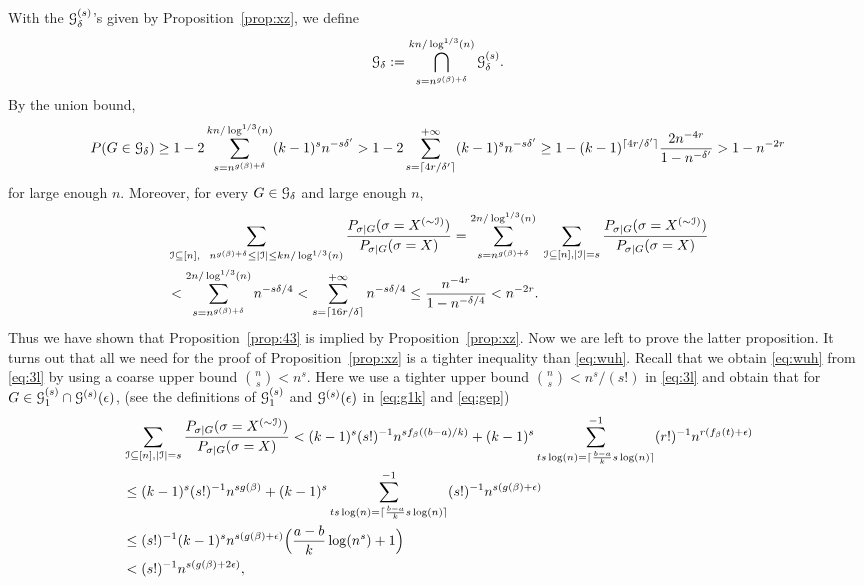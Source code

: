 \documentclass{article}
\begin{document}
With the $\mathcal{G}_\delta^{(s)}$'s given by Proposition~\ref{prop:xz}, we
define 
$$
\mathcal{G}_\delta:=\bigcap_{s=n^{g(\beta)+\delta}}^{kn/\log^{1/3}(n)} \mathcal{G}_\delta^{(s)} .
$$
By the union bound,
$$
P(G\in\mathcal{G}_\delta)\ge 1-2 \sum_{s=n^{g(\beta)+\delta}}^{kn/\log^{1/3}(n)} (k-1)^sn^{-s\delta'}
> 1-2 \sum_{s=\lceil 4r/\delta' \rceil}^{+\infty} (k-1)^sn^{-s\delta'}
\ge 1- (k-1)^{\lceil 4r/\delta' \rceil}\frac{2 n^{-4r}}{1-n^{-\delta'}}
>1-n^{-2r}
$$
for large enough $n$.
 Moreover, for every $G\in\mathcal{G}_\delta$ and large enough $n$,
\begin{align*}
& \sum_{\mathcal{I}\subseteq[n],~~
n^{g(\beta)+\delta}\le |\mathcal{I}|\le kn/\log^{1/3}(n)}
\frac{P_{\sigma|G}(\sigma=X^{(\sim\mathcal{I})})}{P_{\sigma|G}(\sigma=X)} =
\sum_{s=n^{g(\beta)+\delta}}^{2n/\log^{1/3}(n)}
\hspace*{0.05in}
\sum_{\mathcal{I}\subseteq[n],|\mathcal{I}|=s}
\frac{P_{\sigma|G}(\sigma=X^{(\sim \mathcal{I})} )}
{P_{\sigma|G}(\sigma=X)}  \\
& < \sum_{s=n^{g(\beta)+\delta}}^{2n/\log^{1/3}(n)}
n^{-s \delta /4}
< \sum_{s=\lceil 16r/\delta \rceil}^{+\infty}
n^{-s \delta /4}
\le \frac{n^{-4r}}{1-n^{-\delta /4}} < n^{-2r} .
\end{align*}
Thus we have shown that Proposition~\ref{prop:43} is implied by Proposition~\ref{prop:xz}. Now we are left to prove the latter proposition.
It turns out that all we need for the proof of Proposition~\ref{prop:xz} is a tighter inequality than \eqref{eq:wuh}.
Recall that we obtain \eqref{eq:wuh} from \eqref{eq:3l} by using a coarse upper bound $\binom{n}{s}<n^s$.
Here we use a tighter upper bound $\binom{n}{s}<n^s/(s!)$ in \eqref{eq:3l} and obtain that for
$G\in\mathcal{G}_1^{(s)}\cap\mathcal{G}^{(s)}(\epsilon)$,
(see the definitions of $\mathcal{G}_1^{(s)}$ and $\mathcal{G}^{(s)}(\epsilon)$
in \eqref{eq:g1k} and \eqref{eq:gep})
\begin{equation} \label{eq:zm}
\begin{aligned}
& \sum_{\mathcal{I}\subseteq[n],|\mathcal{I}|=s}
\frac{P_{\sigma|G}(\sigma=X^{(\sim \mathcal{I})} )}
{P_{\sigma|G}(\sigma=X)} 
< (k-1)^s(s!)^{-1} n^{sf_{\beta}((b-a)/k)} +
(k-1)^s\sum_{ts\log(n)=\lceil\frac{b-a}{k}s\log(n) \rceil}^{-1}
(r!)^{-1} n^{r(f_{\beta}(t)+\epsilon)} \\
& \le (k-1)^s(s!)^{-1} n^{sg(\beta)}
+ (k-1)^s\sum_{ts\log(n)=\lceil\frac{b-a}{k}s\log(n) \rceil}^{-1}  (s!)^{-1} n^{s(g(\beta) + \epsilon)}  \\
& \le (s!)^{-1} (k-1)^s n^{s(g(\beta) + \epsilon)}
\Big(\frac{a-b}{k}\log(n^s)+1 \Big) \\
& < (s!)^{-1} n^{s(g(\beta) + 2\epsilon)}  ,
\end{aligned}
\end{equation}
\end{document}
